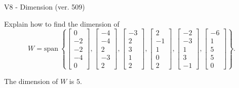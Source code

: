 \begin{exercise}
  \begin{exerciseTitle}V8 - Dimension (ver. 509)\end{exerciseTitle}
  \begin{exerciseStatement}
    Explain how to find the dimension of 
\[W=\mathrm{span}\ \left\{\left[\begin{array}{r}
0 \\
-2 \\
-2 \\
-4 \\
0
\end{array}\right] , \left[\begin{array}{r}
-4 \\
-4 \\
2 \\
-3 \\
2
\end{array}\right] , \left[\begin{array}{r}
-3 \\
2 \\
3 \\
1 \\
2
\end{array}\right] , \left[\begin{array}{r}
2 \\
-1 \\
1 \\
0 \\
2
\end{array}\right] , \left[\begin{array}{r}
-2 \\
-3 \\
1 \\
3 \\
-1
\end{array}\right] , \left[\begin{array}{r}
-6 \\
1 \\
5 \\
5 \\
0
\end{array}\right]\right\}.\]



  \end{exerciseStatement}
  \begin{exerciseAnswer}
   The dimension of \(W\) is  \(5\).
  


  \end{exerciseAnswer}
\end{exercise}